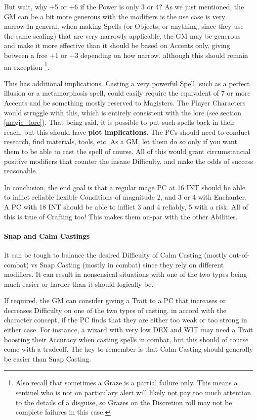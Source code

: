 But wait, why +5 or +6 if the Power is only 3 or 4? As we just mentioned, the GM can be a bit more generous with the modifiers is the use case is very narrow.In general, when making Spells (or Objects, or anything, since they use the same scaling) that are very narrowly applicable, the GM may be generous and make it more effective than it should be based on Accents only, giving between a free +1 or +3 depending on how narrow, although this should remain an exception \footnote{Also recall that sometimes a Graze is a partial failure only. This means a sentinel who is not on particulary alert will likely not pay too much attention to the details of a disguise, so Grazes on the Discretion roll may not be complete failures in this case.}. 

This has additional implications. Casting a very powerful Spell, such as a perfect illusion or a metamorphosis spell, could easily require the equivalent of 7 or more Accents and be something mostly reserved to Magisters. The Player Characters would struggle with this, which is entirely consistent with the lore (see section \ref{magic_lore}). That being said, it is possible to put such spells back in their reach, but this should have \textbf{plot implications}. The PCs should need to conduct research, find materials, tools, etc. As a GM, let them do so only if you want them to be able to cast the spell of course. All of this would grant circumstancial positive modifiers that counter the insane Difficulty, and make the odds of success reasonable.


In conclusion, the end goal is that a regular mage PC at 16 INT should be able to inflict reliable flexible Conditions of magnitude 2, and 3 or 4 with Enchanter. A PC with 18 INT should be able to inflict 3 and 4 reliably, 5 with a risk. All of this is true of Crafting too! This makes them on-par with the other Abilities.


\paragraph{Snap and Calm Castings}

It can be tough to balance the desired Difficulty of Calm Casting (mostly out-of-combat) vs Snap Casting (mostly in combat) since they rely on different modifiers. It can result in nonsensical situations with one of the two types being much easier or harder than it should logically be.

If required, the GM can consider giving a Trait to a PC that increases or decreases Difficulty on one of the two types of casting, in accord with the character concept, if the PC finds that they are either too weak or too strong in either case. For instance, a wizard with very low DEX and WIT may need a Trait boosting their Accuracy when casting spells in combat, but this should of course come with a tradeoff. The key to remember is that Calm Casting should generally be easier than Snap Casting.

